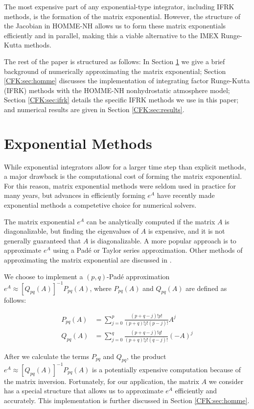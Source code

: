 \documentclass{csri19}
\begin{document}
The most expensive part of any exponential-type integrator, including IFRK 
methods, is the formation of the matrix exponential. However, the structure 
of the Jacobian in HOMME-NH allows us to form these matrix exponentials 
efficiently and in parallel, making this a viable alternative to the IMEX 
Runge-Kutta methods.

The rest of the paper is structured as follows: In Section 
\ref{CFK:sec:matexp} we give a brief background of numerically 
approximating the matrix exponential; Section \ref{CFK:sec:homme} discusses 
the implementation of integrating factor Runge-Kutta (IFRK) methods with 
the HOMME-NH nonhydrostatic atmosphere model; Section \ref{CFK:sec:ifrk} 
details the specific IFRK methods we use in this paper; and numerical 
results are given in Section \ref{CFK:sec:results}.

\section{Exponential Methods}\label{CFK:sec:matexp} 
While exponential integrators allow for a larger time step than explicit 
methods, a major drawback is the computational cost of forming the matrix
exponential. For this reason, matrix exponential methods were seldom used 
in practice for many years, but advances in efficiently forming $e^A$ have 
recently made exponential methods a competetive choice for numerical 
solvers.

The matrix exponential $e^A$ can be analytically computed if the matrix $A$ 
is diagonalizable, but finding the eigenvalues of $A$ is expensive, and it 
is not generally guaranteed that $A$ is diagonalizable. A more popular 
approach is to approximate $e^{A}$ using a Pad\'e or Taylor series 
approximation. Other methods of approximating the matrix exponential are 
discussed in \cite{CFK:Moler2003}.

We choose to implement a $(p,q)$-Pad\'e approximation 
$e^{A}\approx \left[Q_{pq}(A)\right]^{-1}P_{pq}(A)$, where $P_{pq}(A)$ and 
$Q_{pq}(A)$ are defined as follows:

\begin{align*}
P_{pq}(A) &= \sum_{j=0}^p\frac{(p+q-j)!p!}{(p+q)!j!(p-j)!}A^j\\
Q_{pq}(A) &= \sum_{j=0}^q\frac{(p+q-j)!q!}{(p+q)!j!(q-j)!}(-A)^j
\end{align*}

After we calculate the terms $P_{pq}$ and $Q_{pq}$, the product 
$e^A\approx\left[Q_{pq}(A)\right]^{-1}P_{pq}(A)$ is a potentially 
expensive computation because of the matrix inversion. Fortunately, for our
 application, the matrix $A$ we consider has a special structure that allows
us to approximate $e^A$ efficiently and accurately. This implementation is 
further discussed in Section \ref{CFK:sec:homme}.
\end{document}
